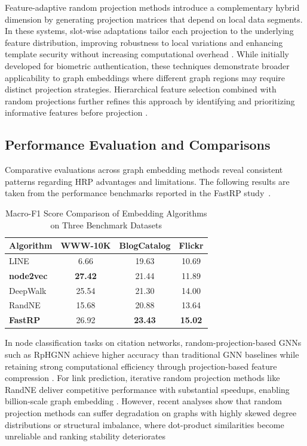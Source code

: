\documentclass[conference]{IEEEtran}
\begin{document}
Feature-adaptive random projection methods introduce a complementary hybrid dimension by generating projection matrices that depend on local data segments. In these systems, slot-wise adaptations tailor each projection to the underlying feature distribution, improving robustness to local variations and enhancing template security without increasing computational overhead \cite{yang2021cancelable}. While initially developed for biometric authentication, these techniques demonstrate broader applicability to graph embeddings where different graph regions may require distinct projection strategies. Hierarchical feature selection combined with random projections further refines this approach by identifying and prioritizing informative features before projection \cite{wang2019hierarchical}.

\subsection{Performance Evaluation and Comparisons}

Comparative evaluations across graph embedding methods reveal consistent patterns regarding HRP advantages and limitations.
The following results are taken from the performance benchmarks reported in the FastRP study~\cite{chen2019fast}.

\begin{table}[ht]
\centering
\caption{Macro-F1 Score Comparison of Embedding Algorithms on Three Benchmark Datasets}
\label{tab:embedding_performance}
\begin{tabular}{lccc}
\toprule
\textbf{Algorithm} & \textbf{WWW-10K} & \textbf{BlogCatalog} & \textbf{Flickr} \\
\midrule
LINE      & 6.66   & 19.63  & 10.69 \\
\textbf{node2vec} & \textbf{27.42} & 21.44  & 11.89 \\
DeepWalk  & 25.54  & 21.30  & 14.00 \\
RandNE    & 15.68  & 20.88  & 13.64 \\
\textbf{FastRP}   & 26.92  & \textbf{23.43} & \textbf{15.02} \\
\bottomrule
\end{tabular}
\end{table}

In node classification tasks on citation networks, random-projection-based GNNs such as RpHGNN achieve higher accuracy than traditional GNN baselines while retaining strong computational efficiency through projection-based feature compression \cite{hu2021rphgnn}. For link prediction, iterative random projection methods like RandNE deliver competitive performance with substantial speedups, enabling billion-scale graph embedding \cite{zhang2018randne}. However, recent analyses show that random projection methods can suffer degradation on graphs with highly skewed degree distributions or structural imbalance, where dot-product similarities become unreliable and ranking stability deteriorates \cite{tadic2024}
\end{document}
